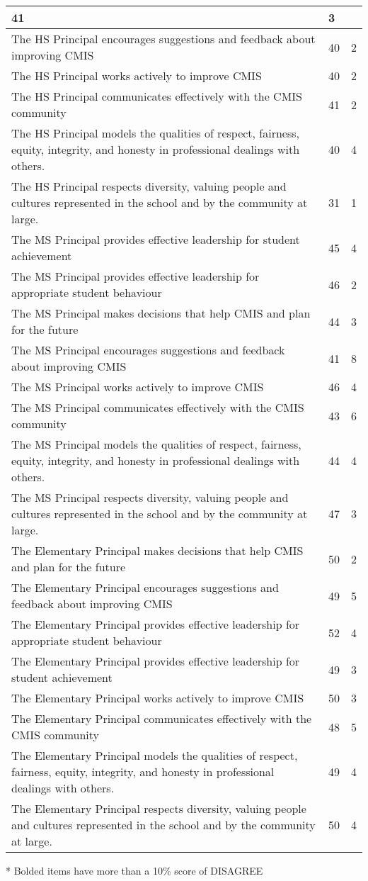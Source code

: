 \begin{table}[H]
\begin{longtabu}{|X[8]|X|X|}
41 &
3 \\
\hline
The HS Principal encourages suggestions and feedback about improving CMIS &
40 &
2 \\
\hline
The HS Principal works actively to improve CMIS &
40 &
2 \\
\hline
The HS Principal communicates effectively with the CMIS community &
41 &
2 \\
\hline
The HS Principal models the qualities of respect, fairness, equity, integrity, and honesty in professional dealings with others. &
40 &
4 \\
\hline
The HS Principal respects diversity, valuing people and cultures represented in the school and by the community at large. &
31 &
1 \\
\hline
The MS Principal provides effective leadership for student achievement &
45 &
4 \\
\hline
The MS Principal provides effective leadership for appropriate student behaviour &
46 &
2 \\
\hline
The MS Principal makes decisions that help CMIS and plan for the future &
44 &
3 \\
\hline
The MS Principal encourages suggestions and feedback about improving CMIS &
41 &
8 \\
\hline
The MS Principal works actively to improve CMIS &
46 &
4 \\
\hline
The MS Principal communicates effectively with the CMIS community &
43 &
6 \\
\hline
The MS Principal models the qualities of respect, fairness, equity, integrity, and honesty in professional dealings with others. &
44 &
4 \\
\hline
The MS Principal respects diversity, valuing people and cultures represented in the school and by the community at large. &
47 &
3 \\
\hline
The Elementary Principal makes decisions that help CMIS and plan for the future &
50 &
2 \\
\hline
The Elementary Principal encourages suggestions and feedback about improving CMIS &
49 &
5 \\
\hline
The Elementary Principal provides effective leadership for appropriate student behaviour &
52 &
4 \\
\hline
The Elementary Principal provides effective leadership for student achievement &
49 &
3 \\
\hline
The Elementary Principal works actively to improve CMIS &
50 &
3 \\
\hline
The Elementary Principal communicates effectively with the CMIS community &
48 &
5 \\
\hline
The Elementary Principal models the qualities of respect, fairness, equity, integrity, and honesty in professional dealings with others. &
49 &
4 \\
\hline
The Elementary Principal respects diversity, valuing people and cultures represented in the school and by the community at large. &
50 &
4 \\
\hline
\end{longtabu}
* Bolded items have more than a 10\% score of DISAGREE


\end{table}
